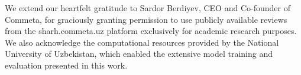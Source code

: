 \documentclass[runningheads]{llncs}
\begin{document}


\begin{credits}
\label{sec:acknowledgement}
\subsubsection{\ackname} We extend our heartfelt gratitude to Sardor Berdiyev, CEO and Co-founder of Commeta, for graciously granting permission to use publicly available reviews from the sharh.commeta.uz platform exclusively for academic research purposes. We also acknowledge the computational resources provided by the National University of Uzbekistan, which enabled the extensive model training and evaluation presented in this work.
\end{credits}






%
%
\end{document}
